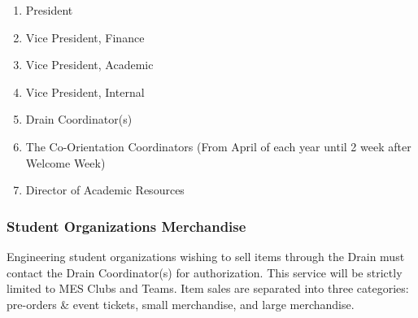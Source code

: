 \begin{enumerate}
 \item
  President
 \item
  Vice President, Finance
 \item
  Vice President, Academic
 \item
  Vice President, Internal
 \item
  Drain Coordinator(s)
 \item
  The Co-Orientation Coordinators (From April of each year until 2 week after Welcome Week) %
 \item
  Director of Academic Resources

\end{enumerate}

\subsubsection{Student Organizations Merchandise}
\label{student-organizations-merchandise}
Engineering student organizations wishing to sell items through the
Drain must contact the Drain Coordinator(s) for authorization. This
service will be strictly limited to MES Clubs and Teams. Item sales are
separated into three categories: pre-orders \& event tickets, small
merchandise, and large merchandise.

